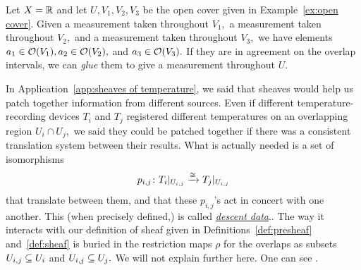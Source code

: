 \documentclass[CT4S-EN-RU]{subfiles}
\begin{document}
\begin{definitionRUS}\label{def:sheaf}
\end{definitionRUS}

\begin{exampleENG}
Let $X=\RR$ and let $U, V_1,V_2,V_3$ be the open cover given in Example~\ref{ex:open cover}. Given a measurement taken throughout $V_1,$ a measurement taken throughout $V_2,$ and a measurement taken throughout $V_3,$ we have elements $a_1\in\mcO(V_1), a_2\in\mcO(V_2),$ and $a_3\in\mcO(V_3).$ If they are in agreement on the overlap intervals, we can {\em glue}  them to give a measurement throughout $U.$
\end{exampleENG}

\begin{exampleRUS}
\end{exampleRUS}

\begin{remarkENG}
In Application~\ref{app:sheaves of temperature}, we said that sheaves would help us patch together information from different sources. Even if different temperature-recording devices $T_i$ and $T_j$ registered different temperatures on an overlapping region $U_i\cap U_j,$ we said they could be patched together if there was a consistent translation system between their results. What is actually needed is a set of isomorphisms 
$$p_{i,j}\taking T_i|_{U_{i,j}}\To{\iso} T_j|_{U_{i,j}}$$ 
that translate between them, and that these $p_{i,j}$'s act in concert with one another. This (when precisely defined,) is called \href{http://en.wikipedia.org/wiki/Descent_theory}{\em descent data}.. The way it interacts with our definition of sheaf given in Definitions~\ref{def:presheaf} and~\ref{def:sheaf} is buried in the restriction maps $\rho$ for the overlaps as subsets $U_{i,j}\ss U_i$ and $U_{i,j}\ss U_j.$ We will not explain further here. One can see \cite{Gro}.
\end{remarkENG}

\begin{remarkRUS}
\end{remarkRUS}
\end{document}
